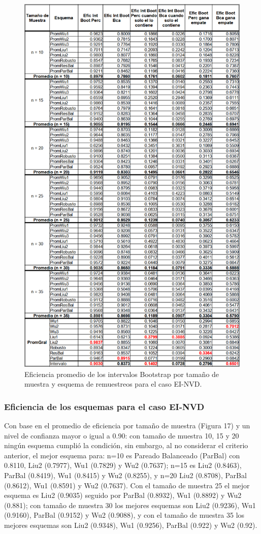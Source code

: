 \begin{figure}[ht] 
	\centering 
	\includegraphics[width=0.55\linewidth]{img/EI_NVD_Efic_Boots.png} 
	\caption{Eficiencia promedio de los intervalos Bootstrap por tamaño de muestra y esquema de remuestreos para el caso EI-NVD.} 
	\label{fig:EI_NVD_Boots}
\end{figure}
\FloatBarrier



\subsubsection{Eficiencia de los esquemas para el caso EI-NVD}
Con base en el promedio de eficiencia por tamaño de muestra (Figura 17) y un nivel de confianza mayor o igual a 0.90: con tamaño de muestra 10, 15 y 20 ningún esquema cumplió la condición,
sin embargo, al no considerar el criterio anterior, el mejor esquema para: n=10 es Pareado Balanceado (ParBal) con 0.8110, Liu2 (0.7977), Wu1 (0.7829) y Wu2 (0.7637); n=15 es Liu2 (0.8463), ParBal (0.8419), Wu1 (0.8415) y Wu2 (0.8255), y n=20 Liu2 (0.8708), ParBal (0.8612), Wu1 (0.8591) y Wu2 (0.7637). Con el tamaño de muestra 25 el mejor esquema es Liu2 (0.9035) seguido por ParBal (0.8932), Wu1 (0.8892) y Wu2 (0.881); con tamaño de muestra 30 los mejores esquemas son Liu2 (0.9236),  Wu1 (0.9160), ParBal (0.9152) y Wu2 (0.9088), y con el tamaño de muestra 35 los mejores esquemas son Liu2 (0.9348),  Wu1 (0.9256), ParBal (0.922) y Wu2 (0.92).
\vspace{.5cm}

